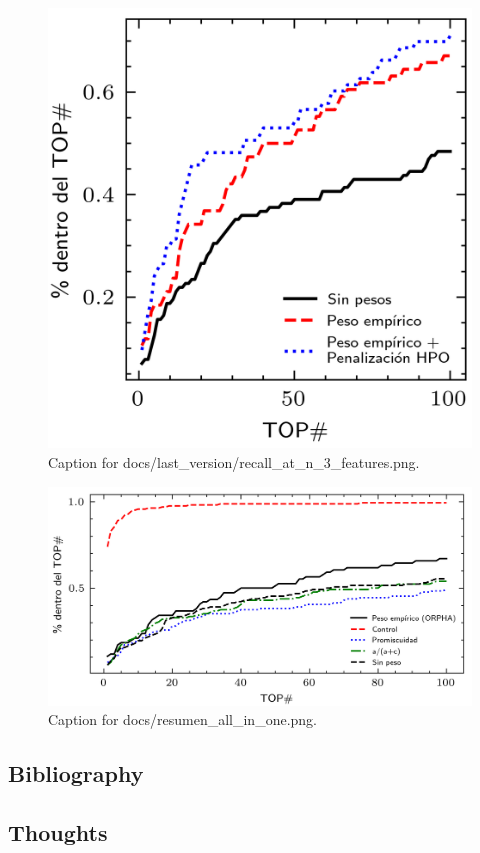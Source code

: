 \documentclass{article}
\begin{document}
\begin{figure}[h] \centering \includegraphics{docs/last_version/recall_at_n_3_features.png} \caption{Caption for docs/last_version/recall_at_n_3_features.png.} \end{figure}
\begin{figure}[h] \centering \includegraphics{docs/resumen_all_in_one.png} \caption{Caption for docs/resumen_all_in_one.png.} \end{figure}
\subsection{Bibliography}
\subsection{Thoughts}
\end{document}
